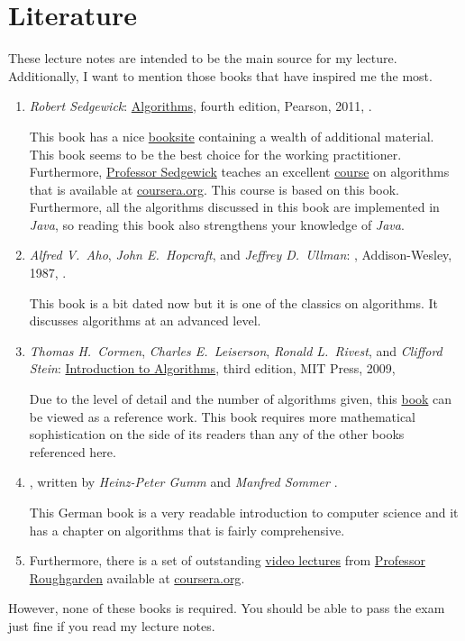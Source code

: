\section{Literature}
These lecture notes are intended to be the main source for my lecture.  Additionally, I want
to mention those books that have inspired me the most.
\begin{enumerate}
\item \textsl{Robert Sedgewick}: \href{https://www.amazon.com/Algorithms-4th-Robert-Sedgewick/dp/032157351X}{Algorithms}, 
      fourth edition, Pearson, 2011, \cite{sedgewick:11}.
    
      This book has a nice \href{http://algs4.cs.princeton.edu/home/}{booksite} containing a wealth
      of additional material.  This book seems to be the best choice for the working practitioner.
      Furthermore, \href{http://www.cs.princeton.edu/~rs/}{Professor Sedgewick} teaches an excellent 
      \href{https://www.coursera.org/course/algs4partI}{course} on algorithms that is available at
      \href{https://www.coursera.org/}{coursera.org}.  This course is based on this book.  Furthermore, all
      the algorithms discussed in this book are implemented in \textsl{Java}, so reading this book
      also strengthens your knowledge of \textsl{Java}.
\item \textsl{Alfred V.~Aho}, \textsl{John E.~Hopcraft}, and \textsl{Jeffrey D.~Ullman}:
      , Addison-Wesley, 1987, \cite{aho:87}.
      
      This book is a bit dated now but it is one of the classics on algorithms.  It discusses algorithms at an
      advanced level.
\item \textsl{Thomas H.~Cormen}, \textsl{Charles E.~Leiserson}, 
      \textsl{Ronald L.~Rivest}, and \textsl{Clifford Stein}:
      \href{https://www.amazon.com/Introduction-Algorithms-3rd-MIT-Press/dp/0262033844}{Introduction to Algorithms}, 
      third edition, MIT Press, 2009, \cite{cormen:09}

      Due to the level of detail and the number of algorithms given, this
      \href{https://en.wikipedia.org/wiki/Introduction_to_Algorithms}{book} can be viewed as a reference work. 
      This book requires more mathematical sophistication on the side of its readers than any of the
      other books referenced here.  
\item {},
      written by \textsl{Heinz-Peter Gumm} and \textsl{Manfred Sommer} \cite{gumm:2013}.
      
      This German book is a very readable introduction to computer science and it has a chapter
      on algorithms that is fairly comprehensive.  
\item Furthermore, there is a set of outstanding 
      \href{https://class.coursera.org/algo-004/class/index}{video lectures} 
      from \href{http://theory.stanford.edu/~tim/}{Professor Roughgarden}
      available at \href{https://www.coursera.org/}{coursera.org}.
\end{enumerate}
However, none of these books is required.  You should be able to pass the exam just fine if you read my lecture notes.

